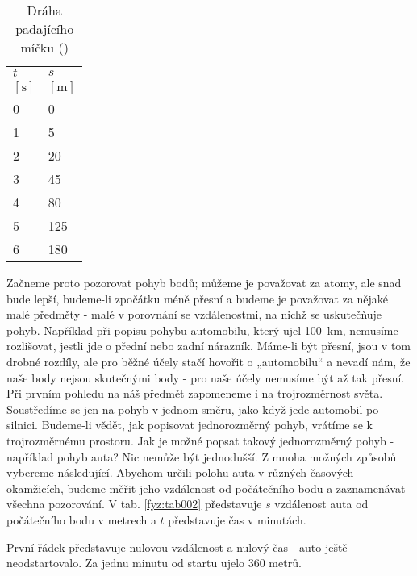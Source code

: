     \begin{table}[ht!]       %
      \centering
      \renewcommand{\arraystretch}{1}
      \begin{tabular}{>{\centering\arraybackslash}p{2em}|>{\centering\arraybackslash}p{3em}}
        \hline  \(t\)    & \(s\)          \\
        \([\text{s}]\)   & \([\text{m}]\)   \\
         \hline  \num{0} & \num{0}          \\
                 \num{1} & \num{5}          \\
                 \num{2} & \num{20}         \\
                 \num{3} & \num{45}         \\
                 \num{4} & \num{80}         \\
                 \num{5} & \num{125}        \\
                 \num{6} & \num{180}        \\
        \hline 
      \end{tabular}
      \caption{Dráha padajícího míčku (\cite[s.~110]{Feynman01})}
      \label{fyz:tab003}
    \end{table}
    Začneme proto pozorovat pohyb bodů; můžeme je považovat za atomy, ale snad bude lepší, 
    budeme-li zpočátku méně přesní a budeme je považovat za nějaké malé předměty - malé v porovnání 
    se vzdálenostmi, na nichž se uskutečňuje pohyb. Například při popisu pohybu automobilu, který 
    ujel \qty{100}{\km}, nemusíme rozlišovat, jestli jde o přední nebo zadní nárazník. Máme-li být 
    přesní, jsou v tom drobné rozdíly, ale pro běžné účely stačí hovořit o „automobilu“ a nevadí 
    nám, že naše body nejsou skutečnými body - pro naše účely nemusíme být až tak přesní. Při 
    prvním pohledu na náš předmět zapomeneme i na trojrozměrnost světa. Soustředíme se jen na pohyb 
    v jednom směru, jako když jede automobil po silnici. Budeme-li vědět, jak popisovat 
    jednorozměrný pohyb, vrátíme se k trojrozměrnému prostoru. Jak je možné popsat takový 
    jednorozměrný pohyb - například pohyb auta? Nic nemůže být jednodušší. Z mnoha možných způsobů 
    vybereme následující. Abychom určili polohu auta v různých časových okamžicích, budeme měřit 
    jeho vzdálenost od počátečního bodu a zaznamenávat všechna pozorování. V tab. \ref{fyz:tab002} 
    představuje \(s\) vzdálenost auta od počátečního bodu v metrech a \(t\) představuje čas v 
    minutách.

    První řádek představuje nulovou vzdálenost a nulový čas - auto ještě neodstartovalo. Za jednu 
    minutu od startu ujelo \num{360} metrů.

